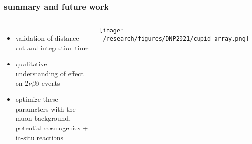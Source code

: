 \documentclass{beamer}
\begin{document}
	\begin{frame}
		\frametitle{summary and future work}
		\begin{columns}[c] %
			
			\begin{itemize}
				\setlength\itemsep{2em}
				\item validation of distance cut and integration time
				\item qualitative understanding of effect on 2$\nu\beta\beta$ events
				\item optimize these parameters with the muon background, potential cosmogenics + in-situ reactions
			\end{itemize}
			
			\texttt{[image: ~/research/figures/DNP2021/cupid\_array.png]}

			
		\end{columns}
	\end{frame}

\end{document}
